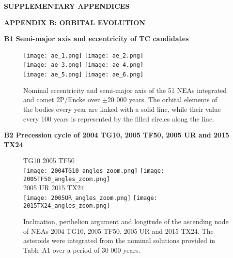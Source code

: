 \documentclass[a4paper,11pt]{article}
\begin{document}
  

\onecolumn
  
  \begin{center}
  \Large \textbf{SUPPLEMENTARY APPENDICES}\\[0.5cm]
  \end{center}


\setcounter{topnumber}{4}%
\setcounter{totalnumber}{4}%

\newcommand{\fignumprefix}{}
\renewcommand{\thefigure}{\fignumprefix\arabic{figure}}
\renewcommand{\theHfigure}{figure.\thefigure}
\newcommand{\setfignumprefix}[1]{%
	\renewcommand{\fignumprefix}{#1}%
	\setcounter{figure}{0}%
}

\textbf{APPENDIX B: ORBITAL EVOLUTION}\\ \label{appendix:orb_evolution_all}

\textbf{B1  Semi-major axis and eccentricity of TC candidates}\\

\setfignumprefix{B}
\begin{figure*}[!ht]
  \centering
  \texttt{[image: ae\_1.png]}
  \texttt{[image: ae\_2.png]}\\
  \texttt{[image: ae\_3.png]}
  \texttt{[image: ae\_4.png]}\\
  \texttt{[image: ae\_5.png]}
  \texttt{[image: ae\_6.png]}
  \caption{Nominal eccentricity and semi-major axis of the 51 NEAs integrated and comet 2P/Encke over $\pm$20 000 years. The orbital elements of the bodies every year are linked with a solid line, while their value every 100 years is represented by the filled circles along the line.}
  \label{fig:ae_allNEAs}
\end{figure*}

\textbf{B2  Precession cycle of 2004 TG10, 2005 TF50, 2005 UR and 2015 TX24}\\

\begin{figure*}[!ht]
   TG10 \hspace{7cm} 2005 TF50\\
  \texttt{[image: 2004TG10\_angles\_zoom.png]}
  \texttt{[image: 2005TF50\_angles\_zoom.png]}\\[0.2cm]
  2005 UR \hspace{7cm} 2015 TX24\\
  \texttt{[image: 2005UR\_angles\_zoom.png]}
  \texttt{[image: 2015TX24\_angles\_zoom.png]}\\
  \caption{Inclination, perihelion argument and longitude of the ascending node of NEAs 2004 TG10, 2005 TF50, 2005 UR and 2015 TX24. The asteroids were integrated from the nominal solutions provided in Table A1 over a period of 30 000 years.}
  \label{fig:All_angles}
\end{figure*}
\end{document}
